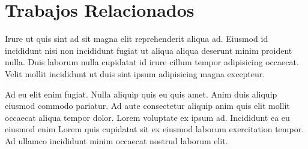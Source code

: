 \section{Trabajos Relacionados}\label{sec:trabajos-relacionados}
Irure ut quis sint ad sit magna elit reprehenderit aliqua ad. Eiusmod id incididunt nisi non incididunt fugiat ut aliqua aliqua deserunt minim proident nulla. Duis laborum nulla cupidatat id irure cillum tempor adipisicing occaecat. Velit mollit incididunt ut duis sint ipsum adipisicing magna excepteur.

Ad eu elit enim fugiat. Nulla aliquip quis eu quis amet. Anim duis aliquip eiusmod commodo pariatur. Ad aute consectetur aliquip anim quis elit mollit occaecat aliqua tempor dolor. Lorem voluptate ex ipsum ad. Incididunt ea eu eiusmod enim Lorem quis cupidatat sit ex eiusmod laborum exercitation tempor. Ad ullamco incididunt minim occaecat nostrud laborum elit.